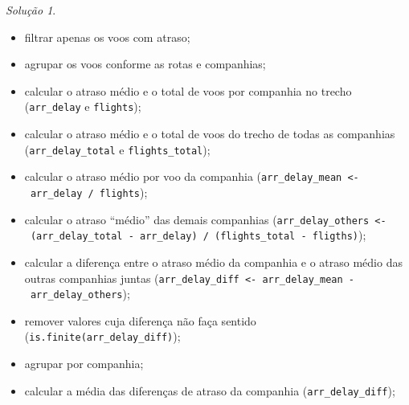 \documentclass[
]{latex/krantz}
\providecommand{\tightlist}{%
  \setlength{\itemsep}{0pt}\setlength{\parskip}{0pt}}
\theoremstyle{definition}
\theoremstyle{definition}
\theoremstyle{definition}
\theoremstyle{definition}
\theoremstyle{remark}
\newtheorem*{solution}{Solução}
\begin{document}
\begin{solution}
\begin{itemize}
\tightlist
\item
  filtrar apenas os voos com atraso;
\item
  agrupar os voos conforme as rotas e companhias;
\item
  calcular o atraso médio e o total de voos por companhia no trecho (\texttt{arr\_delay} e \texttt{flights});
\item
  calcular o atraso médio e o total de voos do trecho de todas as companhias (\texttt{arr\_delay\_total} e \texttt{flights\_total});
\item
  calcular o atraso médio por voo da companhia (\texttt{arr\_delay\_mean\ \textless{}-\ arr\_delay\ /\ flights});
\item
  calcular o atraso ``médio'' das demais companhias (\texttt{arr\_delay\_others\ \textless{}-\ (arr\_delay\_total\ -\ arr\_delay)\ /\ (flights\_total\ -\ fligths)});
\item
  calcular a diferença entre o atraso médio da companhia e o atraso médio das outras companhias juntas (\texttt{arr\_delay\_diff\ \textless{}-\ arr\_delay\_mean\ -\ arr\_delay\_others});
\item
  remover valores cuja diferença não faça sentido (\texttt{is.finite(arr\_delay\_diff)});
\item
  agrupar por companhia;
\item
  calcular a média das diferenças de atraso da companhia (\texttt{arr\_delay\_diff});
\end{itemize}


\end{solution}
\end{document}
